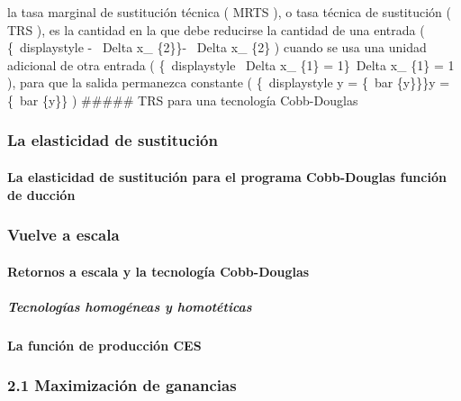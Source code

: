 \documentclass[
]{article}
\begin{document}
la tasa marginal de sustitución técnica ( MRTS ), o tasa técnica de
sustitución ( TRS ), es la cantidad en la que debe reducirse la cantidad
de una entrada ( \{~displaystyle - ~Delta x\_ \{2\}\}- ~Delta x\_ \{2\}
) cuando se usa una unidad adicional de otra entrada ( \{~displaystyle
~Delta x\_ \{1\} = 1\}~Delta x\_ \{1\} = 1 ), para que la salida
permanezca constante ( \{~displaystyle y = \{~bar \{y\}\}\}y = \{~bar
\{y\}\} ) \#\#\#\#\# TRS para una tecnología Cobb-Douglas

\hypertarget{la-elasticidad-de-sustituciuxf3n}{%
\subsubsection{La elasticidad de
sustitución}\label{la-elasticidad-de-sustituciuxf3n}}

\hypertarget{la-elasticidad-de-sustituciuxf3n-para-el-programa-cobb-douglas-funciuxf3n-de-ducciuxf3n}{%
\paragraph{La elasticidad de sustitución para el programa Cobb-Douglas
función de
ducción}\label{la-elasticidad-de-sustituciuxf3n-para-el-programa-cobb-douglas-funciuxf3n-de-ducciuxf3n}}

\hypertarget{vuelve-a-escala}{%
\subsubsection{Vuelve a escala}\label{vuelve-a-escala}}

\hypertarget{retornos-a-escala-y-la-tecnologuxeda-cobb-douglas}{%
\paragraph{Retornos a escala y la tecnología
Cobb-Douglas}\label{retornos-a-escala-y-la-tecnologuxeda-cobb-douglas}}

\hypertarget{tecnologuxedas-homoguxe9neas-y-homotuxe9ticas}{%
\subparagraph{Tecnologías homogéneas y
homotéticas}\label{tecnologuxedas-homoguxe9neas-y-homotuxe9ticas}}

\hypertarget{la-funciuxf3n-de-producciuxf3n-ces}{%
\paragraph{La función de producción
CES}\label{la-funciuxf3n-de-producciuxf3n-ces}}

\hypertarget{maximizaciuxf3n-de-ganancias}{%
\subsubsection{2.1 Maximización de
ganancias}\label{maximizaciuxf3n-de-ganancias}}
\end{document}
